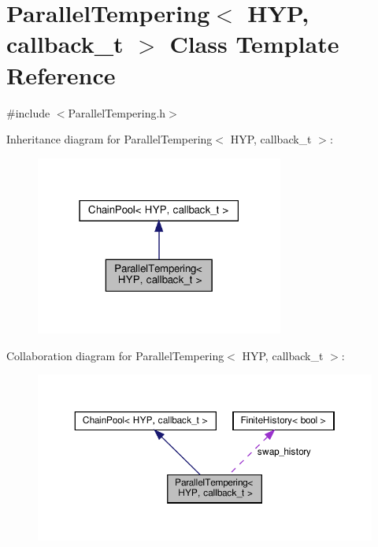 \hypertarget{class_parallel_tempering}{}\section{Parallel\+Tempering$<$ H\+YP, callback\+\_\+t $>$ Class Template Reference}
\label{class_parallel_tempering}


{\ttfamily \#include $<$Parallel\+Tempering.\+h$>$}



Inheritance diagram for Parallel\+Tempering$<$ H\+YP, callback\+\_\+t $>$\+:\nopagebreak
\begin{figure}[H]
\begin{center}
\leavevmode
\includegraphics[width=231pt]{class_parallel_tempering__inherit__graph}
\end{center}
\end{figure}


Collaboration diagram for Parallel\+Tempering$<$ H\+YP, callback\+\_\+t $>$\+:
\nopagebreak
\begin{figure}[H]
\begin{center}
\leavevmode
\includegraphics[width=350pt]{class_parallel_tempering__coll__graph}
\end{center}
\end{figure}
